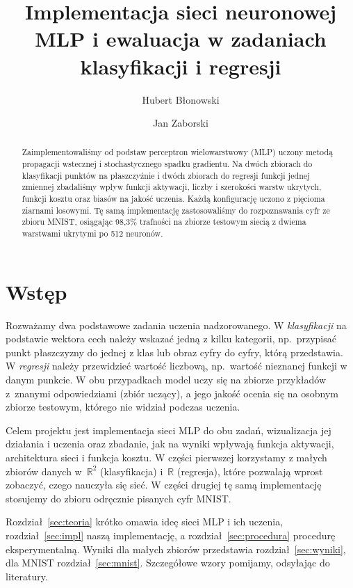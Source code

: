 \documentclass{article}
\title{Implementacja sieci neuronowej MLP i ewaluacja w zadaniach klasyfikacji i regresji}
\author{Hubert Błonowski \and Jan Zaborski}
\date{}
\begin{document}
\maketitle

\begin{abstract}
Zaimplementowaliśmy od podstaw perceptron wielowarstwowy (MLP) uczony metodą propagacji wstecznej
i stochastycznego spadku gradientu. Na dwóch zbiorach do klasyfikacji punktów na płaszczyźnie
i dwóch zbiorach do regresji funkcji jednej zmiennej zbadaliśmy wpływ funkcji aktywacji, liczby
i szerokości warstw ukrytych, funkcji kosztu oraz biasów na jakość uczenia. Każdą konfigurację uczono
z pięcioma ziarnami losowymi. Tę samą implementację zastosowaliśmy do rozpoznawania cyfr ze zbioru
MNIST, osiągając 98,3\% trafności na zbiorze testowym siecią z dwiema warstwami ukrytymi po 512
neuronów.
\end{abstract}

\tableofcontents

\section{Wstęp}

Rozważamy dwa podstawowe zadania uczenia nadzorowanego. W \emph{klasyfikacji} na podstawie wektora
cech należy wskazać jedną z kilku kategorii, np.\ przypisać punkt płaszczyzny do jednej z klas lub
obraz cyfry do cyfry, którą przedstawia. W \emph{regresji} należy przewidzieć wartość liczbową,
np.\ wartość nieznanej funkcji w danym punkcie. W obu przypadkach model uczy się na zbiorze
przykładów z~znanymi odpowiedziami (zbiór uczący), a jego jakość ocenia się na osobnym zbiorze
testowym, którego nie widział podczas uczenia.

Celem projektu jest implementacja sieci MLP do obu zadań, wizualizacja jej działania i uczenia oraz
zbadanie, jak na wyniki wpływają funkcja aktywacji, architektura sieci i funkcja kosztu. W części
pierwszej korzystamy z małych zbiorów danych w~$\mathbb{R}^2$ (klasyfikacja) i~$\mathbb{R}$
(regresja), które pozwalają wprost zobaczyć, czego nauczyła się sieć. W części drugiej tę samą
implementację stosujemy do zbioru odręcznie pisanych cyfr MNIST.

Rozdział~\ref{sec:teoria} krótko omawia ideę sieci MLP i ich uczenia, rozdział~\ref{sec:impl} naszą
implementację, a rozdział~\ref{sec:procedura} procedurę eksperymentalną. Wyniki dla małych zbiorów
przedstawia rozdział~\ref{sec:wyniki}, dla MNIST rozdział~\ref{sec:mnist}. Szczegółowe wzory
pomijamy, odsyłając do literatury.
\end{document}
